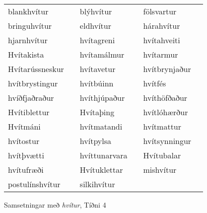 \documentclass{../litmal.tex}{subfiles}
\begin{document}
\begin{wordlist}[H]
\begin{tcolorbox}
	\setlength{\extrarowheight}{3pt}
	\begin{tabular}{BlBlBl}	
		blankhvítur	&	\phantom{ba}	& 	
		blýhvítur		& 	\phantom{ba}	& 	
		fölsvartur	& 	\phantom{ba}	\\ 	
		bringuhvítur	&		& 	
		eldhvítur		& 		& 
		hárahvítur	&		\\ 
		hjarnhvítur	&		& 	
		hvítagreni	& 		& 
		hvítahveiti	& 		\\ 
		Hvítakista	&		& 	
		hvítamálmur	&		& 
		hvítarmur	&		\\ 
		Hvítarússneskur & 	& 	
		hvítavetur	& 		& 
		hvítbrynjaður	 &		\\ 
		hvítbrystingur &		& 	
		hvítbúinn	& 		& 	
		hvítfés		&		\\ 	
		hvíðfjaðraður & 		& 
		hvíthjúpaður	& 		& 
		hvíthöfðaður	&		\\ 
		Hvítiblettur	&		& 	
		Hvítaþing	&		& 
		hvítlóhærður &		\\ 
		Hvítmáni		&		& 
		hvítmatandi	& 		& 	
		hvítmattur	&		\\ 
		hvítostur		& 		& 
		hvítpylsa		&		& 
		hvítsynningur & 		\\ 
		hvítþvætti	&		& 
		hvíttunarvara	&		& 
		Hvítubalar	&		\\ 	
		hvítufræði	& 		& 
		Hvítuklettar	&		& 	
		mishvítur	&		\\ 
		postulínshvítur & 		& 
		silkihvítur	&		& 	
					&
	\end{tabular}
\end{tcolorbox}
	\caption{Samsetningar með \textit{hvítur}, Tíðni 4}
	\label{listi:hvitt.4}
\end{wordlist}
\end{document}
